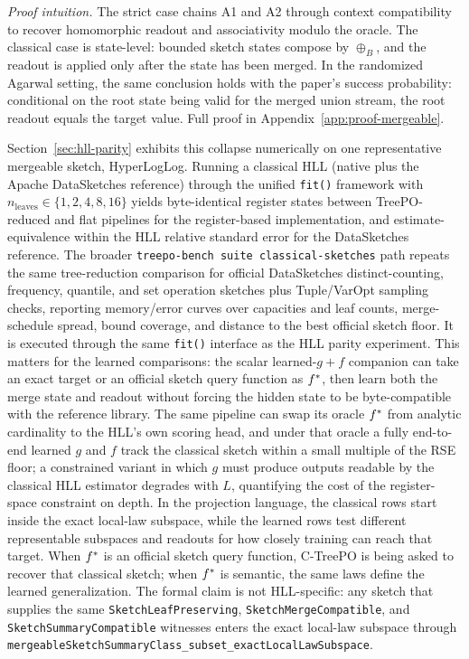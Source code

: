 \noindent\textit{Proof intuition.} The strict case chains A1 and A2 through
context compatibility to recover homomorphic readout and associativity modulo
the oracle. The classical case is state-level: bounded sketch states compose
by $\oplus_B$, and the readout is applied only after the state has been
merged. In the randomized Agarwal setting, the same conclusion holds with the
paper's success probability: conditional on the root state being valid for the
merged union stream, the root readout equals the target value. Full proof in
Appendix~\ref{app:proof-mergeable}.

Section~\ref{sec:hll-parity} exhibits this collapse numerically on one
representative mergeable sketch, HyperLogLog. Running a classical HLL
(native plus the Apache DataSketches reference) through the unified
\texttt{fit()} framework with $n_{\mathrm{leaves}} \in \{1, 2, 4, 8,
16\}$ yields byte-identical register states between TreePO-reduced and
flat pipelines for the register-based implementation, and
estimate-equivalence within the HLL relative standard error for the
DataSketches reference. The broader \texttt{treepo-bench suite
classical-sketches} path repeats the same tree-reduction comparison for
official DataSketches distinct-counting, frequency, quantile, and set
operation sketches plus Tuple/VarOpt sampling checks, reporting
memory/error curves over capacities and leaf counts, merge-schedule
spread, bound coverage, and distance to the best official sketch floor.
It is executed through the same \texttt{fit()} interface as the HLL
parity experiment. This matters for the learned comparisons: the scalar
learned-\(g{+}f\) companion can take an exact target or an official sketch
query function as \(f^\ast\), then learn both the merge state and readout
without forcing the hidden state to be byte-compatible with the reference
library.
The same
pipeline can swap its oracle $f^\ast$ from analytic cardinality to the
HLL's own scoring head, and under that oracle a fully end-to-end learned
$g$ and $f$ track the classical sketch within a small multiple of the RSE
floor; a constrained variant in which $g$ must produce outputs readable by
the classical HLL estimator degrades with $L$, quantifying the cost of the
register-space constraint on depth. In the projection language, the
classical rows start inside the exact local-law subspace, while the
learned rows test different representable subspaces and readouts for how
closely training can reach that target. When $f^\ast$ is an official
sketch query function, C-TreePO is being asked to recover that classical
sketch; when $f^\ast$ is semantic, the same laws define the learned
generalization. The formal claim is not HLL-specific: any sketch that supplies the
same \texttt{SketchLeafPreserving}, \texttt{SketchMergeCompatible}, and
\texttt{SketchSummaryCompatible} witnesses enters the exact local-law
subspace through
\texttt{mergeableSketchSummaryClass\_subset\_exactLocalLawSubspace}.

